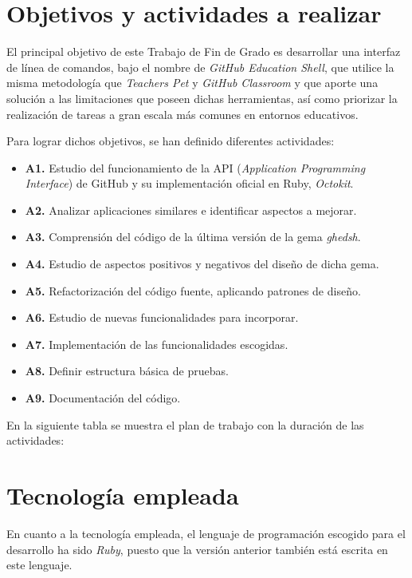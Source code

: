 \section{Objetivos y actividades a realizar}
\label{1:sec:3}

El principal objetivo de este Trabajo de Fin de Grado es desarrollar una interfaz de línea de comandos, bajo el nombre de {\it GitHub Education Shell},
que utilice la misma metodología que {\it Teachers Pet} y {\it GitHub Classroom} y que aporte una solución a las limitaciones que poseen dichas herramientas, así como priorizar
la realización de tareas a gran escala más comunes en entornos educativos.
\bigskip

Para lograr dichos objetivos, se han definido diferentes actividades:
\begin{itemize}
  \item {\bf A1.} Estudio del funcionamiento de la API ({\it Application Programming Interface}) de GitHub y su implementación oficial en Ruby, {\it Octokit}.
  \item {\bf A2.} Analizar aplicaciones similares e identificar aspectos a mejorar.
  \item {\bf A3.} Comprensión del código de la última versión de la gema {\it ghedsh}.
  \item {\bf A4.} Estudio de aspectos positivos y negativos del diseño de dicha gema.
  \item {\bf A5.} Refactorización del código fuente, aplicando patrones de diseño.
  \item {\bf A6.} Estudio de nuevas funcionalidades para incorporar.
  \item {\bf A7.} Implementación de las funcionalidades escogidas.
  \item {\bf A8.} Definir estructura básica de pruebas.
  \item {\bf A9.} Documentación del código.
\end{itemize}
\bigskip

En la siguiente tabla se muestra el plan de trabajo con la duración de las actividades:


\section{Tecnología empleada}
\label{1:sec:4}
 
En cuanto a la tecnología empleada, el lenguaje de programación escogido para el desarrollo ha sido {\it Ruby},
puesto que la versión anterior también está escrita en este lenguaje.
\bigskip


